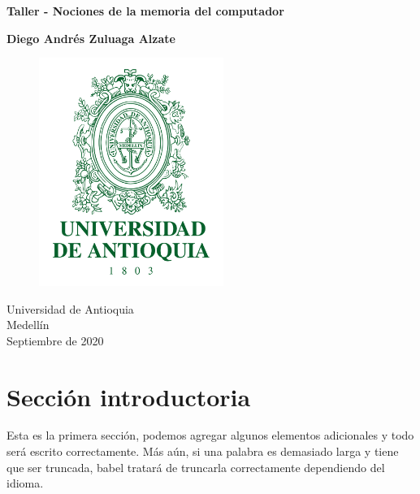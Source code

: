 \documentclass{article}
\begin{document}
\begin{titlepage}
    \begin{center}
        \vspace*{1cm}
            
        \Huge
        \textbf{Taller - Nociones de la memoria del computador}
            
        \vspace{1.5cm}
        
        \textbf{Diego Andrés Zuluaga Alzate}
        
        \vspace{1.5cm}
        
        \begin{figure}[h]
        \includegraphics[width=6cm]{logoudea.png}
        \centering
        \label{fig:logoudea}
        \end{figure}
            
        \vspace{0.7cm}
            
        \Large
        Universidad de Antioquia\\
        Medellín\\
        Septiembre de 2020
            
    \end{center}
\end{titlepage}

\tableofcontents

\section{Sección introductoria}
Esta es la primera sección, podemos agregar algunos elementos adicionales y todo será escrito correctamente. Más aún, si una palabra es demasiado larga y tiene que ser truncada, babel tratará de truncarla correctamente dependiendo del idioma.
\end{document}
